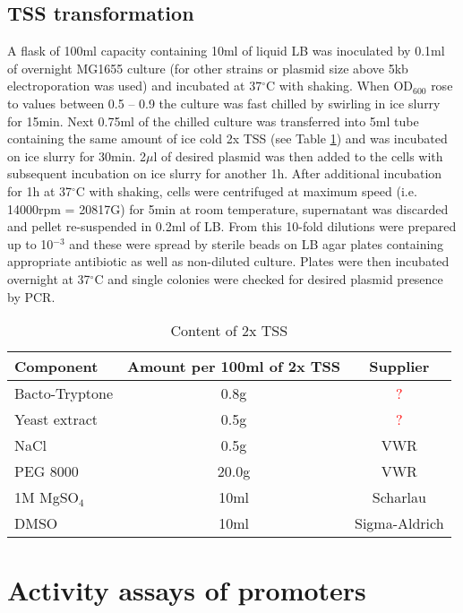 \subsection{TSS transformation}
A flask of 100ml capacity containing 10ml of liquid LB was inoculated by 0.1ml of overnight MG1655 culture (for other strains or plasmid size above 5kb electroporation was used) and incubated at 37$^{\circ}$C with shaking.
When OD$_{600}$ rose to values between 0.5 -- 0.9 the culture was fast chilled by swirling in ice slurry for 15min.
Next 0.75ml of the chilled culture was transferred into 5ml tube containing the same amount of ice cold 2x TSS (see Table \ref{tss}) and was incubated on ice slurry for 30min.
2$\mu$l of desired plasmid was then added to the cells with subsequent incubation on ice slurry for another 1h.
After additional incubation for 1h at 37$^{\circ}$C with shaking, cells were centrifuged at maximum speed (i.e. 14000rpm = 20817G) for 5min at room temperature, supernatant was discarded and pellet re-suspended in 0.2ml of LB.
From this 10-fold dilutions were prepared up to 10$^{-3}$ and these were spread by sterile beads on LB agar plates containing appropriate antibiotic as well as non-diluted culture.
Plates were then incubated overnight at 37$^{\circ}$C and single colonies were checked for desired plasmid presence by PCR.

\begin{center}
	\begin{longtable}[c]{|l|c|c|}
\caption{Content of 2x TSS} \label{tss} \\

\toprule \multicolumn{1}{|l|}{\textbf{Component}} & \multicolumn{1}{c|}{\textbf{Amount per 100ml of 2x TSS}} & \multicolumn{1}{c|}{\textbf{Supplier}} \\
\midrule
\endhead

\bottomrule
\endlastfoot

Bacto-Tryptone & 0.8g & \textcolor{red}{?} \\
\hline
Yeast extract & 0.5g & \textcolor{red}{?} \\
\hline
NaCl & 0.5g & VWR \\
\hline
PEG 8000 & 20.0g & VWR \\
\hline
1M MgSO$_{4}$ & 10ml & Scharlau \\
\hline
DMSO & 10ml & Sigma-Aldrich \\
	\end{longtable}
\end{center}


\section{Activity assays of promoters}
